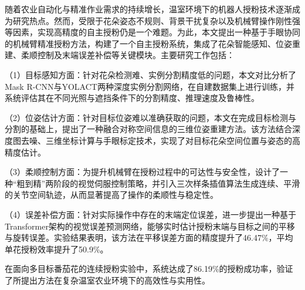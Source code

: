 %
% 
%



\begin{ChineseAbstract}
  随着农业自动化与精准作业需求的持续增长，温室环境下的机器人授粉技术逐渐成为研究热点。然而，受限于花朵姿态不规则、背景干扰复杂以及机械臂操作刚性强等因素，实现高精度的自主授粉仍是一个难题。为此，本文提出一种基于手眼协同的机械臂精准授粉方法，构建了一个自主授粉系统，集成了花朵智能感知、位姿重建、柔顺控制及末端误差补偿等关键模块。主要研究工作包括：
  
  （1）目标感知方面：针对花朵检测难、实例分割精度低的问题，本文对比分析了Mask R-CNN与YOLACT两种深度实例分割网络，在自建数据集上进行训练，并系统评估其在不同光照与遮挡条件下的分割精度、推理速度及鲁棒性。
  
  （2）位姿估计方面：针对目标位姿难以准确获取的问题，本文在完成目标检测与分割的基础上，提出了一种融合对称空间信息的三维位姿重建方法。该方法结合深度图去噪、三维坐标计算与手眼标定技术，实现了对目标花朵空间位置与姿态的高精度估计。
  
  （3）柔顺控制方面：为提升机械臂在授粉过程中的可达性与安全性，设计了一种“粗到精”两阶段的视觉伺服控制策略，并引入三次样条插值算法生成连续、平滑的关节空间轨迹，从而显著提高了操作的柔顺性与稳定性。
  
  （4）误差补偿方面：针对实际操作中存在的末端定位误差，进一步提出一种基于Transformer架构的视觉误差预测网络，能够实时估计授粉末端与目标之间的平移与旋转误差。实验结果表明，该方法在平移误差方面的精度提升了46.47\%，平均单花授粉效率提升了50.9\%。
  
  在面向多目标番茄花的连续授粉实验中，系统达成了86.19\%的授粉成功率，验证了所提出方法在复杂温室农业环境下的高效性与实用性。
   
    

\end{ChineseAbstract}



